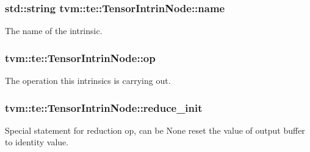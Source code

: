 \subsubsection[{\texorpdfstring{name}{name}}]{\setlength{\rightskip}{0pt plus 5cm}std\+::string tvm\+::te\+::\+Tensor\+Intrin\+Node\+::name}\hypertarget{classtvm_1_1te_1_1TensorIntrinNode_ac38bf30e4754ecb701de8f5b185873b3}{}\label{classtvm_1_1te_1_1TensorIntrinNode_ac38bf30e4754ecb701de8f5b185873b3}


The name of the intrinsic. 

\subsubsection[{\texorpdfstring{op}{op}}]{ tvm\+::te\+::\+Tensor\+Intrin\+Node\+::op}\hypertarget{classtvm_1_1te_1_1TensorIntrinNode_a5a589bd81a76f0001f05ac0013e74f85}{}\label{classtvm_1_1te_1_1TensorIntrinNode_a5a589bd81a76f0001f05ac0013e74f85}


The operation this intrinsics is carrying out. 

\subsubsection[{\texorpdfstring{reduce\+\_\+init}{reduce_init}}]{ tvm\+::te\+::\+Tensor\+Intrin\+Node\+::reduce\+\_\+init}\hypertarget{classtvm_1_1te_1_1TensorIntrinNode_a63b22c1a14e6ce3bdc2900019600efee}{}\label{classtvm_1_1te_1_1TensorIntrinNode_a63b22c1a14e6ce3bdc2900019600efee}


Special statement for reduction op, can be None reset the value of output buffer to identity value. 

